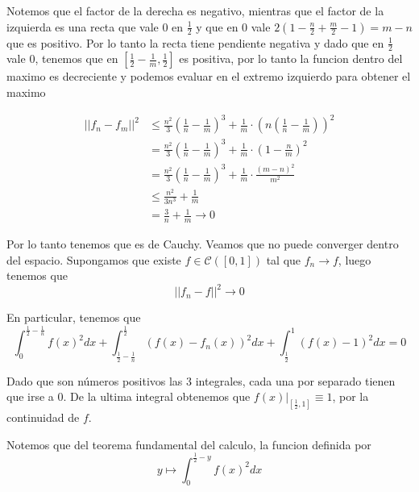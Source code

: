 \documentclass[a4paper,oneside,10.5pt]{USMArt}
\begin{document}
\begin{sol}
  Notemos que el factor de la derecha es negativo, mientras que el factor de la izquierda es una recta que vale $0$ en
  $\frac{1}{2}$ y que en $0$ vale $2(1 - \frac{n}{2} + \frac{m}{2} - 1) = m - n$ que es positivo. Por lo tanto la recta
  tiene pendiente negativa y dado que en $\frac{1}{2}$ vale $0$, tenemos que en $[\frac{1}{2} - \frac{1}{m}, \frac{1}{2}]$ es positiva, por lo tanto la funcion dentro del maximo es decreciente y podemos evaluar en el extremo
  izquierdo para obtener el maximo

  \begin{align*}
    ||f_{n} - f_{m}||^{2} &\leq \frac{n^{2}}{3}(\frac{1}{n} - \frac{1}{m})^{3} + \frac{1}{m} \cdot (n(\frac{1}{n} - \frac{1}{m}))^{2}\\
                          &= \frac{n^{2}}{3}(\frac{1}{n} - \frac{1}{m})^{3} + \frac{1}{m} \cdot (1 - \frac{n}{m})^{2}\\
                          &= \frac{n^{2}}{3}(\frac{1}{n} - \frac{1}{m})^{3} + \frac{1}{m} \cdot \frac{(m - n)^{2}}{m^{2}}\\
                          &\leq \frac{n^{2}}{3n^{3}} + \frac{1}{m}\\
                          &= \frac{3}{n} + \frac{1}{m} \to 0
  \end{align*}
\end{sol}

Por lo tanto tenemos que es de Cauchy. Veamos que no puede converger dentro del espacio. Supongamos que existe $f \in \mathcal{C}([0, 1])$ tal que $f_{n} \to f$, luego tenemos que
\begin{equation*}
  ||f_{n} - f||^{2} \to 0
\end{equation*}

En particular, tenemos que
\begin{equation*}
  \int_{0}^{\frac{1}{2} - \frac{1}{n}} f(x)^{2} dx + \int_{\frac{1}{2} - \frac{1}{n}}^{\frac{1}{2}} (f(x) - f_{n}(x))^{2} dx + \int_{\frac{1}{2}}^{1}(f(x) - 1)^{2} dx = 0
\end{equation*}

Dado que son números positivos las 3 integrales, cada una por separado tienen que irse a $0$. De la ultima integral
obtenemos que $f(x)|_{[\frac{1}{2}, 1]} \equiv 1$, por la continuidad de $f$.

Notemos que del teorema fundamental del calculo, la funcion definida por
\begin{equation*}
  y \mapsto \int_{0}^{\frac{1}{2} - y} f(x)^{2} dx
\end{equation*}
\end{document}
